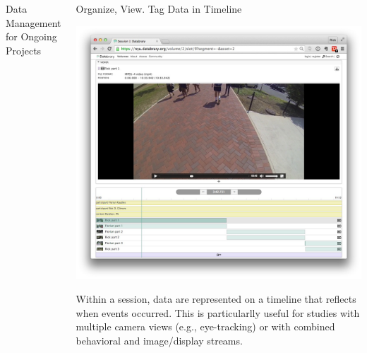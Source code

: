 \documentclass[final]{beamer}
\begin{document}
\begin{frame}{}
\begin{columns}[t]
\begin{block}{Data Management for Ongoing Projects}
		\end{block}
		\begin{block}{Organize, View. Tag Data in Timeline}
			\begin{center}
				\includegraphics[width=\textwidth]{img/timeline.png}
			\end{center}
			Within a session, data are represented on a timeline that reflects when events occurred. This is particularlly useful for studies with multiple camera views (e.g., eye-tracking) or with combined behavioral and image/display streams.
		\end{block}
\end{columns}

\end{frame}
\end{document}
